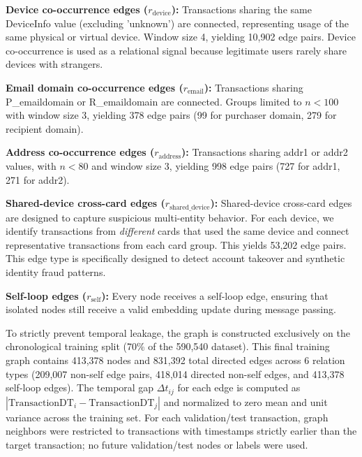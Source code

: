 \documentclass[journal]{IEEEtran}
\begin{document}
\textbf{Device co-occurrence edges ($r_{\text{device}}$):} Transactions sharing the same DeviceInfo value (excluding 'unknown') are connected, representing usage of the same physical or virtual device. Window size 4, yielding 10,902 edge pairs. Device co-occurrence is used as a relational signal because legitimate users rarely share devices with strangers.

\textbf{Email domain co-occurrence edges ($r_{\text{email}}$):} Transactions sharing P\_emaildomain or R\_emaildomain are connected. Groups limited to $n < 100$ with window size 3, yielding 378 edge pairs (99 for purchaser domain, 279 for recipient domain).

\textbf{Address co-occurrence edges ($r_{\text{address}}$):} Transactions sharing addr1 or addr2 values, with $n < 80$ and window size 3, yielding 998 edge pairs (727 for addr1, 271 for addr2).

\textbf{Shared-device cross-card edges ($r_{\text{shared\_device}}$):} Shared-device cross-card edges are designed to capture suspicious multi-entity behavior. For each device, we identify transactions from \emph{different} cards that used the same device and connect representative transactions from each card group. This yields 53,202 edge pairs. This edge type is specifically designed to detect account takeover and synthetic identity fraud patterns.

\textbf{Self-loop edges ($r_{\text{self}}$):} Every node receives a self-loop edge, ensuring that isolated nodes still receive a valid embedding update during message passing.

To strictly prevent temporal leakage, the graph is constructed exclusively on the chronological training split (70\% of the 590,540 dataset). This final training graph contains 413,378 nodes and 831,392 total directed edges across 6 relation types (209,007 non-self edge pairs, 418,014 directed non-self edges, and 413,378 self-loop edges). The temporal gap $\Delta t_{ij}$ for each edge is computed as $|\text{TransactionDT}_i - \text{TransactionDT}_j|$ and normalized to zero mean and unit variance across the training set. For each validation/test transaction, graph neighbors were restricted to transactions with timestamps strictly earlier than the target transaction; no future validation/test nodes or labels were used.
\end{document}
